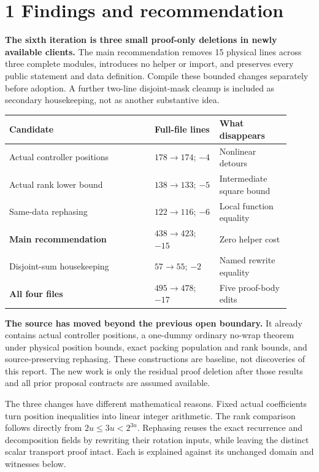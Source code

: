 \section*{1 Findings and recommendation}
\textbf{The sixth iteration is three small proof-only deletions in newly available clients.} The main recommendation removes 15 physical lines across three complete modules, introduces no helper or import, and preserves every public statement and data definition. Compile these bounded changes separately before adoption. A further two-line disjoint-mask cleanup is included as secondary housekeeping, not as another substantive idea.

\begin{tabular}{@{}L{0.47\linewidth}L{0.21\linewidth}L{0.23\linewidth}@{}}\toprule
Candidate & Full-file lines & What disappears\\\midrule
Actual controller positions & $178\to174$; $-4$ & Nonlinear detours\\[4pt]
Actual rank lower bound & $138\to133$; $-5$ & Intermediate square bound\\[4pt]
Same-data rephasing & $122\to116$; $-6$ & Local function equality\\[4pt]
\textbf{Main recommendation} & $438\to423$; $-15$ & Zero helper cost\\[4pt]
Disjoint-sum housekeeping & $57\to55$; $-2$ & Named rewrite equality\\[4pt]
\textbf{All four files} & $495\to478$; $-17$ & Five proof-body edits\\\bottomrule
\end{tabular}

\textbf{The source has moved beyond the previous open boundary.} It already contains actual controller positions, a one-dummy ordinary no-wrap theorem under physical position bounds, exact packing population and rank bounds, and source-preserving rephasing. These constructions are baseline, not discoveries of this report. The new work is only the residual proof deletion after those results and all prior proposal contracts are assumed available.

The three changes have different mathematical reasons. Fixed actual coefficients turn position inequalities into linear integer arithmetic. The rank comparison follows directly from $2u\le3u<2^{3u}$. Rephasing reuses the exact recurrence and decomposition fields by rewriting their rotation inputs, while leaving the distinct scalar transport proof intact. Each is explained against its unchanged domain and witnesses below.

